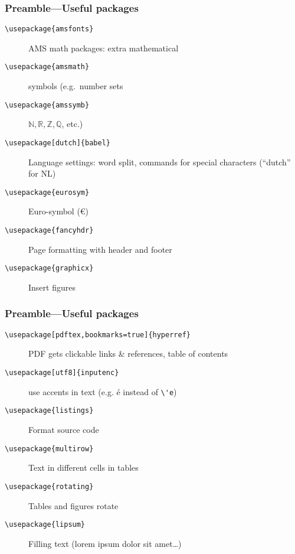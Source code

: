 \documentclass[aspectratio=169]{beamer}
\begin{document}
\begin{frame}[fragile]
  \frametitle{Preamble---Useful packages}

  \begin{description}
    \item[\texttt{\textbackslash{}usepackage\{amsfonts\}}] AMS math packages: extra mathematical
    \item[\texttt{\textbackslash{}usepackage\{amsmath\}}] symbols (e.g.\ number sets
    \item[\texttt{\textbackslash{}usepackage\{amssymb\}}] \(\mathbb{N}, \mathbb{R}, \mathbb{Z}, \mathbb{Q}\), etc.)
    \pause
    \item[\texttt{\textbackslash{}usepackage[dutch]\{babel\}}] Language settings: word split, commands for special characters (``dutch'' for NL)
    \pause
    \item[\texttt{\textbackslash{}usepackage\{eurosym\}}] Euro-symbol (\euro)
    \pause
    \item[\texttt{\textbackslash{}usepackage\{fancyhdr\}}] Page formatting with header and footer
    \pause
    \item[\texttt{\textbackslash{}usepackage\{graphicx\}}] Insert figures
  \end{description}
\end{frame}

\begin{frame}[fragile]
  \frametitle{Preamble---Useful packages}

  \begin{description}
    \item[\texttt{\textbackslash{}usepackage[pdftex,bookmarks=true]\{hyperref\}}] PDF gets clickable links \& references, table of contents \pause
    \item[\texttt{\textbackslash{}usepackage[utf8]\{inputenc\}}] use accents in text (e.g. é instead of \verb|\'e|) \pause
    \item[\texttt{\textbackslash{}usepackage\{listings\}}] Format source code \pause
    \item[\texttt{\textbackslash{}usepackage\{multirow\}}] Text in different cells in tables \pause
    \item[\texttt{\textbackslash{}usepackage\{rotating\}}] Tables and figures rotate \pause
    \item[\texttt{\textbackslash{}usepackage\{lipsum\}}] Filling text (lorem ipsum dolor sit amet\ldots)
  \end{description}
\end{frame}
\end{document}
